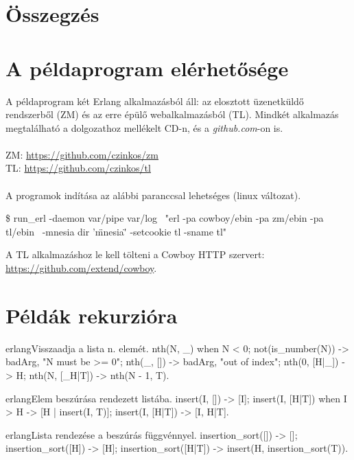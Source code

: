 \documentclass[12pt, a4paper, oneside]{book}
\begin{document}
\chapter{Összegzés}

\appendix
\chapter{A példaprogram elérhetősége}
A példaprogram két Erlang alkalmazásból áll: az elosztott üzenetküldő
rendszerből (ZM) és az erre épülő webalkalmazásból (TL). Mindkét alkalmazás
megtalálható a dolgozathoz mellékelt CD-n, és a \emph{github.com}-on is.
\\
\\
\noindent ZM: \url{https://github.com/czinkos/zm}\\
TL: \url{https://github.com/czinkos/tl}
\\
\\
\noindent A programok indítása az alábbi paranccsal lehetséges (linux változat).

\begin{code}{}{}
\$ run_erl -daemon var/pipe var/log \
    "erl -pa cowboy/ebin -pa zm/ebin -pa tl/ebin \
     -mnesia dir '\"mnesia\"' -setcookie tl -sname tl"
\end{code}

A TL alkalmazáshoz le kell tölteni a Cowboy HTTP szervert:
\url{https://github.com/extend/cowboy}.


\chapter{Példák rekurzióra}
\begin{code}{erlang}{Visszaadja a lista n. elemét.}
nth(N, _) when N < 0; not(is_number(N)) ->
  {badArg, "N must be >= 0"};
nth(_, []) ->
  {badArg, "out of index"};
nth(0, [H|_]) ->
  H;
nth(N, [_H|T]) ->
  nth(N - 1, T).
\end{code}

\begin{code}{erlang}{Elem beszúrása rendezett listába.}
insert(I, []) ->
  [I];
insert(I, [H|T]) when I > H ->
  [H | insert(I, T)];
insert(I, [H|T]) ->
  [I, H|T].
\end{code}

\begin{code}{erlang}{Lista rendezése a beszúrás függvénnyel.}
insertion_sort([]) ->
  [];
insertion_sort([H]) ->
  [H];
insertion_sort([H|T]) ->
  insert(H, insertion_sort(T)).
\end{code}
\end{document}
